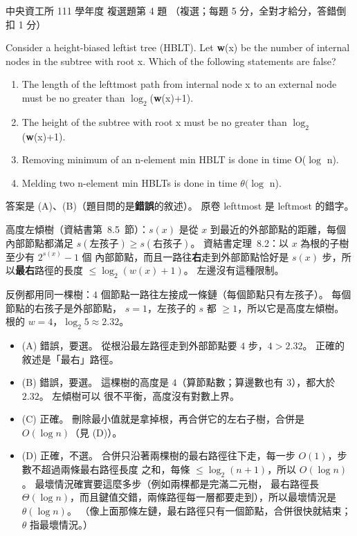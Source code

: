 \begin{pastexam}[label={px:ncu-111-dsa-04}]{中央資工所 111 學年度 複選題第 4 題}
（複選；每題 5 分，全對才給分，答錯倒扣 1 分）

Consider a height-biased leftist tree (HBLT). Let \textbf{w}(x) be the number of internal nodes in
the subtree with root x. Which of the following statements are false?
\begin{enumerate}[label=(\Alph*)]
\item The length of the lefttmost path from internal node x to an external node must be no greater
than $\log_2$(\textbf{w}(x)+1).
\item The height of the subtree with root x must be no greater than $\log_2$(\textbf{w}(x)+1).
\item Removing minimum of an n-element min HBLT is done in time O($\log$ n).
\item Melding two n-element min HBLTs is done in time $\theta(\log$ n).
\end{enumerate}
\end{pastexam}

\begin{pastsoln}
答案是 (A)、(B)（題目問的是\textbf{錯誤}的敘述）。 原卷 lefttmost 是 leftmost 的錯字。

高度左傾樹（資結書第~8.5~節）：$s(x)$ 是從 $x$ 到最近的外部節點的距離，每個內部節點都滿足
$s(\text{左孩子}) \ge s(\text{右孩子})$。 資結書定理~8.2：以 $x$ 為根的子樹至少有 $2^{s(x)} - 1$ 個
內部節點，而且一路往\textbf{右}走到外部節點恰好是 $s(x)$ 步，所以\textbf{最右}路徑的長度
$\le \log_2(w(x) + 1)$。 左邊沒有這種限制。

反例都用同一棵樹：$4$ 個節點一路往左接成一條鏈（每個節點只有左孩子）。 每個節點的右孩子是外部節點，
$s = 1$，左孩子的 $s$ 都 $\ge 1$，所以它是高度左傾樹。 根的 $w = 4$，$\log_2 5 \approx 2.32$。
\begin{itemize}
\item (A) 錯誤，要選。 從根沿最左路徑走到外部節點要 $4$ 步，$4 > 2.32$。 正確的敘述是「最右」路徑。
\item (B) 錯誤，要選。 這棵樹的高度是 $4$（算節點數；算邊數也有 $3$），都大於 $2.32$。 左傾樹可以
很不平衡，高度沒有對數上界。
\item (C) 正確。 刪除最小值就是拿掉根，再合併它的左右子樹，合併是 $O(\log n)$（見 (D)）。
\item (D) 正確，不選。 合併只沿著兩棵樹的最右路徑往下走，每一步 $O(1)$，步數不超過兩條最右路徑長度
之和，每條 $\le \log_2(n + 1)$，所以 $O(\log n)$。 最壞情況確實要這麼多步（例如兩棵都是完滿二元樹，
最右路徑長 $\Theta(\log n)$，而且鍵值交錯，兩條路徑每一層都要走到），所以最壞情況是
$\theta(\log n)$。 （像上面那條左鏈，最右路徑只有一個節點，合併很快就結束；$\theta$ 指最壞情況。）
\end{itemize}
\end{pastsoln}
